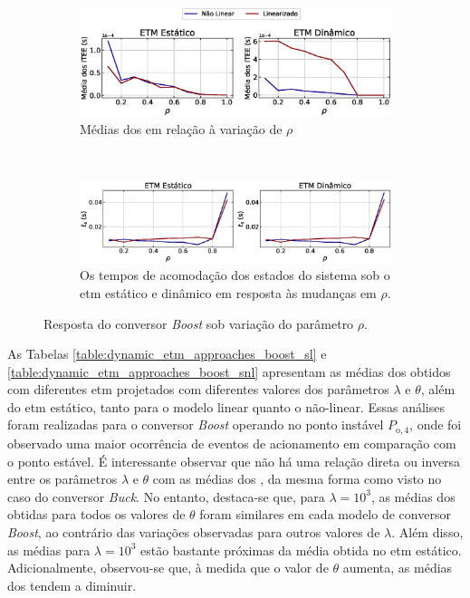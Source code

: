 \begin{figure}[H]
  \centering
  \captionsetup{justification=centering}
  \begin{subfigure}{1.\textwidth}
    \centering
    \includegraphics[width=1.\textwidth]{figuras/boost/itee-mean.eps}
    \caption{Médias dos  em relação à variação de $\rho$}
  \end{subfigure}
  \\[6pt]
  \begin{subfigure}{1.\textwidth} 
    \centering
    \includegraphics[width=1.\textwidth]{figuras/boost/ts.eps}
    \caption{Os tempos de acomodação dos estados do sistema sob o \acrshort{etm} estático e dinâmico em resposta às mudanças em $\rho$.}
  \end{subfigure}
  \caption{Resposta do conversor \textit{Boost }sob variação do parâmetro $\rho$.}
  \label{fig:boost_converter_mu}
\end{figure}

As Tabelas \ref{table:dynamic_etm_approaches_boost_sl} e \ref{table:dynamic_etm_approaches_boost_snl} apresentam as médias dos  obtidos com diferentes \acrshort{etm} projetados com diferentes valores dos parâmetros $\lambda$ e $\theta$, além do \acrshort{etm} estático, tanto para o modelo linear quanto o não-linear. Essas análises foram realizadas para o conversor \textit{Boost }operando no ponto instável $P_{\mathrm{o}, 4}$, onde foi observado uma maior ocorrência de eventos de acionamento em comparação com o ponto estável. É interessante observar que não há uma relação direta ou inversa entre os parâmetros $\lambda$ e $\theta$ com as médias dos , da mesma forma como visto no caso do conversor \textit{Buck}. No entanto, destaca-se que, para $\lambda = 10^3$, as médias dos  obtidas para todos os valores de $\theta$ foram similares em cada modelo de conversor \textit{Boost}, ao contrário das variações observadas para outros valores de $\lambda$. Além disso, as médias para $\lambda = 10^3$ estão bastante próximas da média obtida no \acrshort{etm} estático. Adicionalmente, observou-se que, à medida que o valor de $\theta$ aumenta, as médias dos  tendem a diminuir.

